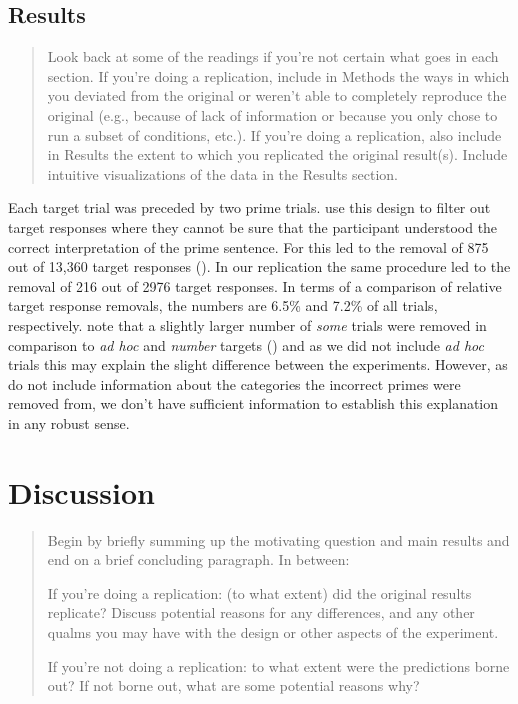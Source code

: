 \documentclass[10pt]{article}
\begin{document}
\begin{multicols}{2}
\subsection{Results}
\label{sec:results}

\begin{quote}
  Look back at some of the readings if you're not certain what goes in each section. If you're doing a replication, include in Methods the ways in which you deviated from the original or weren't able to completely reproduce the original (e.g., because of lack of information or because you only chose to run a subset of conditions, etc.). If you're doing a replication, also include in Results the extent to which you replicated the original result(s). Include intuitive visualizations of the data in the Results section.
\end{quote}

Each target trial was preceded by two prime trials.
\citeauthor{Bott:2016aa} use this design to filter out target responses where they cannot be sure that the participant understood the correct interpretation of the prime sentence.
For \citeauthor{Bott:2016aa} this led to the removal of 875 out of 13,360 target responses (\citeyear[124]{Bott:2016aa}).
In our replication the same procedure led to the removal of 216 out of 2976 target responses.
In terms of a comparison of relative target response removals, the numbers are 6.5\% and 7.2\% of all trials, respectively.
\citeauthor{Bott:2016aa} note that a slightly larger number of \emph{some} trials were removed in comparison to \emph{ad hoc} and \emph{number} targets (\citeyear[124]{Bott:2016aa}) and as we did not include \emph{ad hoc} trials this may explain the slight difference between the experiments.
However, as \citeauthor{Bott:2016aa} do not include information about the categories the incorrect primes were removed from, we don't have sufficient information to establish this explanation in any robust sense.




\section{Discussion}
\label{sec:discussion}

\begin{quote}
  Begin by briefly summing up the motivating question and main results and end on a brief concluding paragraph. In between:

  If you're doing a replication: (to what extent) did the original results replicate? Discuss potential reasons for any differences, and any other qualms you may have with the design or other aspects of the experiment.

  If you're not doing a replication: to what extent were the predictions borne out? If not borne out, what are some potential reasons why?
\end{quote}

\end{multicols}

\vfill
\printbibliography
\end{document}
